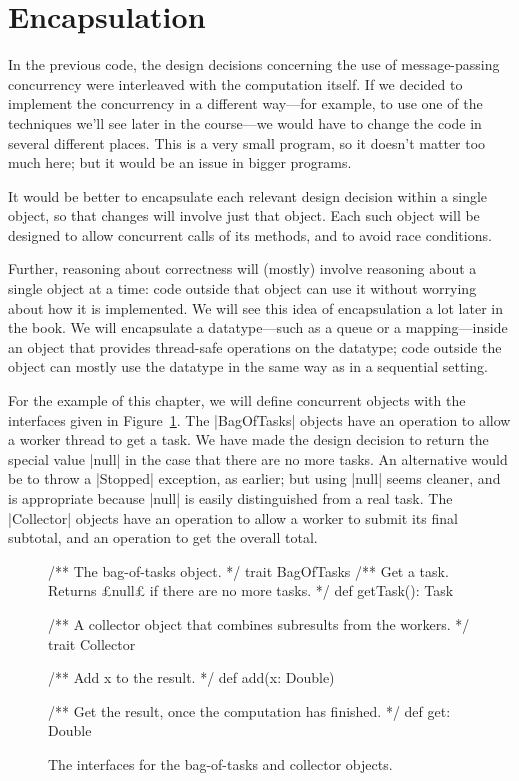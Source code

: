 \section{Encapsulation}
\label{sec:bag-of-tasks-encapsulation}

In the previous code, the design decisions concerning the use of
message-passing concurrency were interleaved with the computation itself.  If
we decided to implement the concurrency in a different way---for example, to
use one of the techniques we'll see later in the course---we would have to
change the code in several different places.  This is a very small program, so
it doesn't matter too much here; but it would be an issue in bigger programs.

It would be better to encapsulate each relevant design decision within a
single object, so that changes will involve just that object.  Each such
object will be designed to allow concurrent calls of its methods, and to avoid
race conditions.  

Further, reasoning about correctness will (mostly) involve reasoning about a
single object at a time: code outside that object can use it without worrying
about how it is implemented.  We will see this idea of encapsulation a lot
later in the book.  We will encapsulate a datatype---such as a queue or a
mapping---inside an object that provides thread-safe operations on the
datatype; code outside the object can mostly use the datatype in the same way
as in a sequential setting.  


For the example of this chapter, we will define concurrent objects with the
interfaces given in Figure~\ref{fig:BoT-interfaces}.  The |BagOfTasks| objects
have an operation to allow a worker thread to get a task.  We have made the
design decision to return the special value |null| in the case that there are
no more tasks.  An alternative would be to throw a |Stopped| exception, as
earlier; but using |null| seems cleaner, and is appropriate because |null| is
easily distinguished from a real task.  The |Collector| objects have an
operation to allow a worker to submit its final subtotal, and an operation to
get the overall total.


\begin{figure}
\begin{scala}
  /** The bag-of-tasks object. */
  trait BagOfTasks{
    /** Get a task.  Returns £null£ if there are no more tasks. */
    def getTask(): Task 
  }  

  /** A collector object that combines subresults from the workers. */
  trait Collector{
    /** Add x to the result. */
    def add(x: Double) 

    /** Get the result, once the computation has finished. */
    def get: Double 
  }
\end{scala}
\caption{The interfaces for the bag-of-tasks and collector objects.}
\label{fig:BoT-interfaces}
\end{figure}

